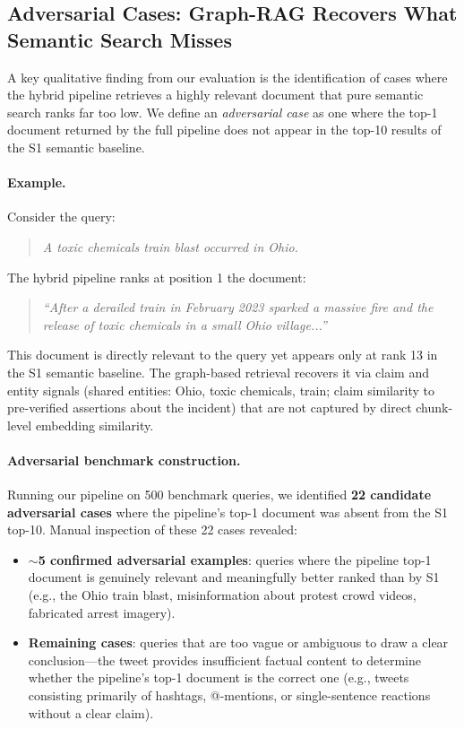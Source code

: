 \documentclass[10pt]{article}
\begin{document}
\subsection{Adversarial Cases: Graph-RAG Recovers What Semantic Search Misses}

A key qualitative finding from our evaluation is the identification of cases where the hybrid pipeline retrieves a highly relevant document that pure semantic search ranks far too low. We define an \emph{adversarial case} as one where the top-1 document returned by the full pipeline does not appear in the top-10 results of the S1 semantic baseline.

\paragraph{Example.} Consider the query:

\begin{quote}
\small
\textit{A toxic chemicals train blast occurred in Ohio.}
\end{quote}

The hybrid pipeline ranks at position 1 the document:

\begin{quote}
\small
\textit{``After a derailed train in February 2023 sparked a massive fire and the release of toxic chemicals in a small Ohio village...''}
\end{quote}

This document is directly relevant to the query yet appears only at rank 13 in the S1 semantic baseline. The graph-based retrieval recovers it via claim and entity signals (shared entities: Ohio, toxic chemicals, train; claim similarity to pre-verified assertions about the incident) that are not captured by direct chunk-level embedding similarity.

\paragraph{Adversarial benchmark construction.} Running our pipeline on 500 benchmark queries, we identified \textbf{22 candidate adversarial cases} where the pipeline's top-1 document was absent from the S1 top-10. Manual inspection of these 22 cases revealed:

\begin{itemize}[itemsep=2pt]
    \item \textbf{$\sim$5 confirmed adversarial examples}: queries where the pipeline top-1 document is genuinely relevant and meaningfully better ranked than by S1 (e.g., the Ohio train blast, misinformation about protest crowd videos, fabricated arrest imagery).
    \item \textbf{Remaining cases}: queries that are too vague or ambiguous to draw a clear conclusion---the tweet provides insufficient factual content to determine whether the pipeline's top-1 document is the correct one (e.g., tweets consisting primarily of hashtags, @-mentions, or single-sentence reactions without a clear claim).
\end{itemize}
\end{document}
